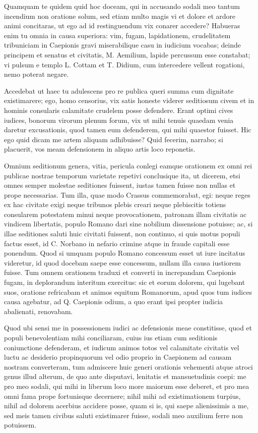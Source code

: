  Quamquam te quidem quid hoc doceam, qui in accusando sodali meo tantum incendium non oratione solum, sed etiam multo magis vi et dolore et ardore animi concitaras, ut ego ad id restinguendum vix conarer accedere? Habueras enim tu omnia in causa superiora: vim, fugam, lapidationem, crudelitatem tribuniciam in Caepionis gravi miserabilique casu in iudicium vocabas; deinde principem et senatus et civitatis, M. Aemilium, lapide percussum esse constabat; vi pulsum e templo L. Cottam et T. Didium, cum intercedere vellent rogationi, nemo poterat negare.

 Accedebat ut haec tu adulescens pro re publica queri summa cum dignitate existimarere; ego, homo censorius, vix satis honeste viderer seditiosum civem et in hominis consularis calamitate crudelem posse defendere. Erant optimi cives iudices, bonorum virorum plenum forum, vix ut mihi tenuis quaedam venia daretur excusationis, quod tamen eum defenderem, qui mihi quaestor fuisset. Hic ego quid dicam me artem aliquam adhibuisse? Quid fecerim, narrabo; si placuerit, vos meam defensionem in aliquo artis loco reponetis.

 Omnium seditionum genera, vitia, pericula conlegi eamque orationem ex omni rei publicae nostrae temporum varietate repetivi conclusique ita, ut dicerem, etsi omnes semper molestae seditiones fuissent, iustas tamen fuisse non nullas et prope necessarias. Tum illa, quae modo Crassus commemorabat, egi: neque reges ex hac civitate exigi neque tribunos plebis creari neque plebiscitis totiens consularem potestatem minui neque provocationem, patronam illam civitatis ac vindicem libertatis, populo Romano dari sine nobilium dissensione potuisse; ac, si illae seditiones saluti huic civitati fuissent, non continuo, si quis motus populi factus esset, id C. Norbano in nefario crimine atque in fraude capitali esse ponendum. Quod si umquam populo Romano concessum esset ut iure incitatus videretur, id quod docebam saepe esse concessum, nullam illa causa iustiorem fuisse. Tum omnem orationem traduxi et converti in increpandam Caepionis fugam, in deplorandum interitum exercitus: sic et eorum dolorem, qui lugebant suos, oratione refricabam et animos equitum Romanorum, apud quos tum iudices causa agebatur, ad Q. Caepionis odium, a quo erant ipsi propter iudicia abalienati, renovabam.

 Quod ubi sensi me in possessionem iudici ac defensionis meae constitisse, quod et populi benevolentiam mihi conciliaram, cuius ius etiam cum seditionis coniunctione defenderam, et iudicum animos totos vel calamitate civitatis vel luctu ac desiderio propinquorum vel odio proprio in Caepionem ad causam nostram converteram, tum admiscere huic generi orationis vehementi atque atroci genus illud alterum, de quo ante disputavi, lenitatis et mansuetudinis coepi: me pro meo sodali, qui mihi in liberum loco more maiorum esse deberet, et pro mea omni fama prope fortunisque decernere; nihil mihi ad existimationem turpius, nihil ad dolorem acerbius accidere posse, quam si is, qui saepe alienissimis a me, sed meis tamen civibus saluti existimarer fuisse, sodali meo auxilium ferre non potuissem.

